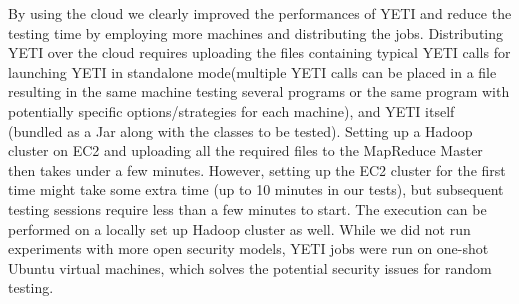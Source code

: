 \documentclass [a4paper, 11pt, twoside] {report}
\begin{document}
By using the cloud we clearly improved the performances of YETI and reduce the testing time by 
employing more machines and distributing the jobs. 
Distributing YETI over the cloud requires uploading the files containing typical YETI calls for launching YETI in standalone mode(multiple 
YETI calls can be placed in a file resulting in the same machine testing several programs or the same program with potentially specific options/strategies for each machine), and 
YETI itself (bundled as a Jar along with the classes to be tested). Setting up a Hadoop cluster on EC2  and uploading all the required files to the 
MapReduce Master then takes under a few minutes. However, setting up the EC2 cluster for the first time might 
take some  extra time (up to 10 minutes in our tests), but subsequent testing sessions require less than a few minutes to start. 
The execution can be performed on a locally set up Hadoop cluster as well. While we did not run experiments with 
more open security models, YETI jobs were run on one-shot Ubuntu virtual machines, which solves
the potential security issues for random testing.
\end{document}
